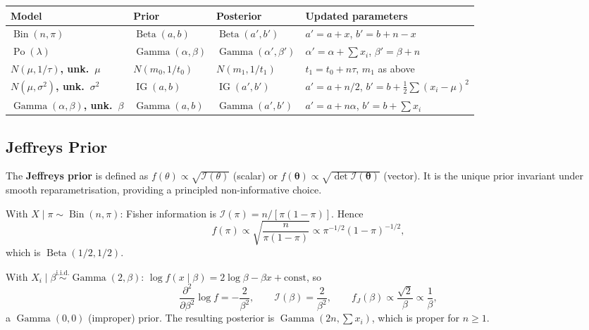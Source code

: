 \documentclass[11pt, a4paper]{article}
\newcommand{\iid}{\overset{\text{i.i.d.}}{\sim}}
\newcommand{\calI}{\mathcal{I}}
\begin{document}
\begin{center}
\renewcommand{\arraystretch}{2.0}
\begin{tabular}{>{\bfseries}p{3.0cm} p{3.2cm} p{3.2cm} p{3.2cm}}
\toprule
Model & Prior & Posterior & Updated parameters \\
\midrule
$\operatorname{Bin}(n,\pi)$ & $\operatorname{Beta}(a,b)$ & $\operatorname{Beta}(a',b')$ & $a'=a+x$, $b'=b+n-x$ \\
$\operatorname{Po}(\lambda)$ & $\operatorname{Gamma}(\alpha,\beta)$ & $\operatorname{Gamma}(\alpha',\beta')$ & $\alpha'=\alpha+\sum x_i$, $\beta'=\beta+n$ \\
$N(\mu,1/\tau)$, unk.\ $\mu$ & $N(m_0,1/t_0)$ & $N(m_1,1/t_1)$ & $t_1=t_0+n\tau$, $m_1$ as above \\
$N(\mu,\sigma^2)$, unk.\ $\sigma^2$ & $\operatorname{IG}(a,b)$ & $\operatorname{IG}(a',b')$ & $a'=a+n/2$, $b'=b+\tfrac{1}{2}\sum(x_i-\mu)^2$ \\
$\operatorname{Gamma}(\alpha,\beta)$, unk.\ $\beta$ & $\operatorname{Gamma}(a,b)$ & $\operatorname{Gamma}(a',b')$ & $a'=a+n\alpha$, $b'=b+\sum x_i$ \\
\bottomrule
\end{tabular}
\end{center}

\subsection*{Jeffreys Prior}

\begin{thmbox}
The \textbf{Jeffreys prior} is defined as $f(\theta) \propto \sqrt{\calI(\theta)}$ (scalar) or $f(\boldsymbol\theta) \propto \sqrt{\det\calI(\boldsymbol\theta)}$ (vector). It is the unique prior invariant under smooth reparametrisation, providing a principled non-informative choice.
\end{thmbox}

\begin{exbox}
With $X \mid \pi \sim \operatorname{Bin}(n,\pi)$: Fisher information is
$\calI(\pi) = n/[\pi(1-\pi)]$. Hence
\[
  f(\pi) \propto \sqrt{\frac{n}{\pi(1-\pi)}} \propto \pi^{-1/2}(1-\pi)^{-1/2},
\]
which is $\operatorname{Beta}(1/2, 1/2)$.
\end{exbox}

\begin{exbox}
With $X_i \mid \beta \iid \operatorname{Gamma}(2, \beta)$: $\log f(x \mid \beta) = 2\log\beta - \beta x + \text{const}$, so
\[
  \frac{\partial^2}{\partial\beta^2}\log f = -\frac{2}{\beta^2},
  \qquad
  \calI(\beta) = \frac{2}{\beta^2},
  \qquad
  f_J(\beta) \propto \frac{\sqrt{2}}{\beta} \propto \frac{1}{\beta},
\]
a $\operatorname{Gamma}(0,0)$ (improper) prior. The resulting posterior is $\operatorname{Gamma}(2n, \sum x_i)$, which is proper for $n \geq 1$.
\end{exbox}
\end{document}
